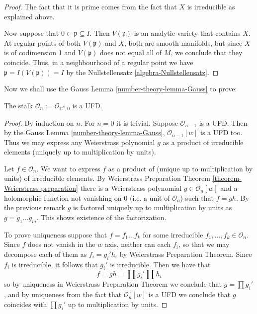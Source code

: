 \begin{proof} 
The fact that it is prime comes from the fact that $X$ is
irreducible as explained above.

Now suppose that $0 \subset \mathfrak{p} \subseteq I$.
Then $V(\mathfrak{p})$ is an analytic variety that contains $X$.
At regular points of both $V(\mathfrak{p})$ and $X$, 
both are smooth manifolds, but since $X$ is of codimension 1 and 
$V(\mathfrak{p})$ does not equal all of  $M$, 
we conclude that they coincide. 
Thus, in a neighbourhood
of a regular point we have $\mathfrak{p}=I(V(\mathfrak{p}))=I$ by the
Nullstellensatz \ref{algebra-Nullstellensatz}.
\end{proof}

Now we shall use the Gauss Lemma 
\ref{number-theory-lemma-Gauss} to prove:

\begin{lemma}
\label{lemma-stalk-is-UFD}
The stalk $\mathcal{O}_n:=\mathcal{O}_{\mathbb{C}^n,0}$ is a UFD.
\end{lemma}

\begin{proof}
By induction on $n$. For $n=0$ it is trivial. Suppose $\mathcal{O}_{n-1}$ is a
UFD. Then by the Gauss Lemma 
\ref{number-theory-lemma-Gauss}, $\mathcal{O}_{n-1}[w]$ is a UFD
too. Thus we may express any Weierstrass polynomial $g$ as a product of
irreducible elements (uniquely up to multiplication by units).

Let $f\in \mathcal{O}_n$. We want to express $f$ as a product of (unique up to
multiplication by units) of irreducible elements. By Weierstrass Preparation
Theorem \ref{theorem-Weierstrass-preparation} there is a Weierstrass polynomial
$g\in\mathcal{O}_n[w]$ and a holomorphic function not vanishing on $0$ (i.e. a
unit of $\mathcal{O}_n$) such that $f=gh$. By the previous remark $g$ is
factored uniquely up to multiplication by units as $g=g_1\ldots g_m$. This shows
existence of the factorization.

To prove uniqueness suppose that $f=f_1\ldots f_k$ for some irreducible
$f_1,\ldots,f_k\in\mathcal{O}_n$. Since $f$ does not vanish in the $w$ axis,
neither can each $f_i$, so that we may decompose each of them as  $f_i=g_i'h_i$
by Weierstrass Preparation Theorem. Since $f_i$ is irreducible, it follows that
$g_i'$ is irreducible. Then we have that $$ f=gh=\prod g_i'\prod h_i $$ so by
uniqueness in Weierstrass Preparation Theorem we conclude that $g=\prod g_i'$,
and by uniqueness from the fact that  $\mathcal{O}_n[w]$ is a UFD we conclude
that $g$ coincides with $\prod g_i'$ up to multiplication by units.
\end{proof}

